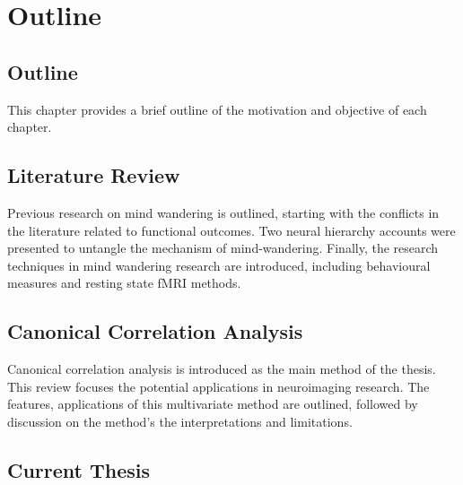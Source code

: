 \chapter{Outline}
\label{ch:outline}

\newpage
\lorem

\lorem

\section{Outline}
This chapter provides a brief outline of the motivation and objective of each chapter.

\section{Literature Review}

Previous research on mind wandering is outlined, starting with the conflicts in the literature related to functional outcomes. Two neural hierarchy accounts were presented to untangle the mechanism of mind-wandering. Finally, the research techniques in mind wandering research are introduced, including behavioural measures and resting state fMRI methods. 

\section{Canonical Correlation Analysis}

Canonical correlation analysis is introduced as the main method of the thesis. This review focuses the potential applications in neuroimaging research. The features, applications of this multivariate method are outlined, followed by discussion on the method's the interpretations and limitations. 

\section{Current Thesis}

